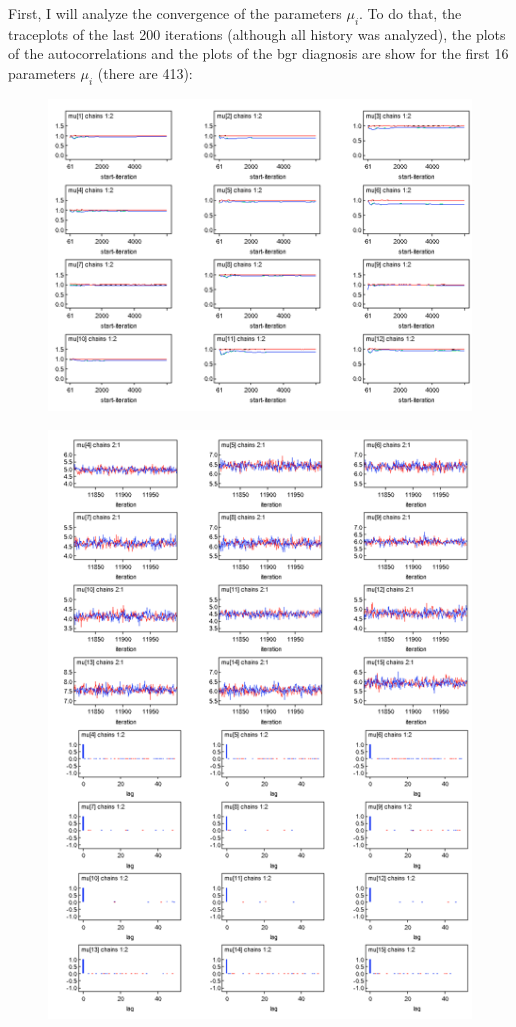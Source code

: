 \documentclass{article}
\begin{document}
First, I will analyze the convergence of the parameters $\mu_i$. To do that, the traceplots of the last 200 iterations (although all history was analyzed), the plots of the autocorrelations and the plots of the bgr diagnosis are show for the first 16 parameters $\mu_i$ (there are 413):
\begin{figure}[ht!]
\centering
\includegraphics[width=13cm]{figures/model1_mu2.png}
\end{figure}


\begin{figure}[ht!]
\centering
\includegraphics[width=12cm]{figures/model1_mu.png}
\end{figure}
 
\end{document}

